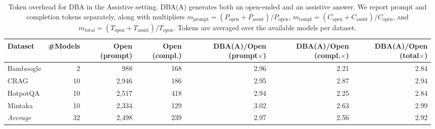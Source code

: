 \begin{table}[t]
\centering
\caption{Token overhead for DBA in the Assistive setting. DBA(A) generates both an open-ended and an assistive answer. We report prompt and completion tokens separately, along with multipliers $m_{\text{prompt}}=(P_{\text{open}}+P_{\text{assist}})/P_{\text{open}}$, $m_{\text{compl}}=(C_{\text{open}}+C_{\text{assist}})/C_{\text{open}}$, and $m_{\text{total}}=(T_{\text{open}}+T_{\text{assist}})/T_{\text{open}}$. Tokens are averaged over the available models per dataset.}
\label{tab:efficiency_overhead_assistive}
\begin{tabular}{lrrrrrr}
\toprule
\textbf{Dataset} & \textbf{\#Models} & \textbf{Open (prompt)} & \textbf{Open (compl.)} & \textbf{DBA(A)/Open (prompt$\times$)} & \textbf{DBA(A)/Open (compl.$\times$)} & \textbf{DBA(A)/Open (total$\times$)} \\
\midrule
Bamboogle & 2 & 988 & 168 & 2.96 & 2.21 & 2.84 \\
CRAG & 10 & 2,946 & 186 & 2.95 & 2.87 & 2.94 \\
HotpotQA & 10 & 2,517 & 418 & 2.94 & 2.25 & 2.84 \\
Mintaka & 10 & 2,334 & 129 & 3.02 & 2.63 & 2.99 \\
\midrule
\textit{Average} & 32 & 2,498 & 239 & 2.97 & 2.56 & 2.92 \\
\bottomrule
\end{tabular}
\end{table}
